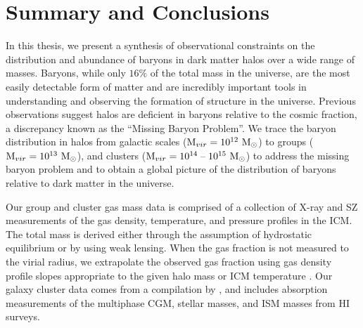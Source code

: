 \chapter{Summary and Conclusions}
\label{chap:Conclusions}

In this thesis, we present a synthesis of observational constraints on
the distribution and abundance of baryons in dark matter halos over a
wide range of masses. Baryons, while only $16\%$ of the total mass in
the universe, are the most easily detectable form of matter and are
incredibly important tools in understanding and observing the
formation of structure in the universe. Previous
observations suggest halos are deficient in baryons relative to the
cosmic fraction, a discrepancy known as the ``Missing Baryon
Problem''. We trace the baryon distribution in halos from galactic
scales ($\textrm{M\ensuremath{_{vir}}}{} = 10^{12}~\textrm{M}_\odot$) to groups ($\textrm{M\ensuremath{_{vir}}}{}=10^{13}~\textrm{M}_\odot$),
and clusters ($\textrm{M\ensuremath{_{vir}}}{} = 10^{14}\;\textrm{--}\;10^{15}~\textrm{M}_\odot$) to address the missing
baryon problem and to obtain a global picture of the distribution of
baryons relative to dark matter in the universe. 

Our group and cluster gas mass data is comprised of a collection of
X-ray and SZ measurements of the gas density, temperature, and
pressure profiles in the ICM. The total mass is derived either through
the assumption of hydrostatic equilibrium or by using weak
lensing. When the gas fraction is not measured to the virial radius,
we extrapolate the observed gas fraction using gas density profile
slopes appropriate to the given halo mass or ICM temperature
\citep{Rasheed2011}. Our galaxy cluster data comes from a compilation
by \citet{Werk2014}, and includes absorption measurements of the
multiphase CGM, stellar masses, and ISM masses from HI surveys.

